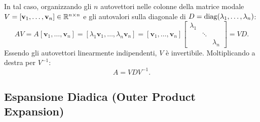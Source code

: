 In tal caso, organizzando gli $n$ autovettori nelle colonne della matrice modale $V = [\mathbf{v}_1, \dots, \mathbf{v}_n] \in \mathbb{R}^{n \times n}$ e gli autovalori sulla diagonale di $D = \operatorname{diag}(\lambda_1, \dots, \lambda_n)$:
\begin{equation}
    A V = A [\mathbf{v}_1, \dots, \mathbf{v}_n] = [\lambda_1 \mathbf{v}_1, \dots, \lambda_n \mathbf{v}_n] = [\mathbf{v}_1, \dots, \mathbf{v}_n] \begin{bmatrix} \lambda_1 & & \\ & \ddots & \\ & & \lambda_n \end{bmatrix} = V D.
\end{equation}
Essendo gli autovettori linearmente indipendenti, $V$ \`e invertibile. Moltiplicando a destra per $V^{-1}$:
\begin{equation}
    A = V D V^{-1}.
\end{equation}

\subsection{Espansione Diadica (Outer Product Expansion)}

